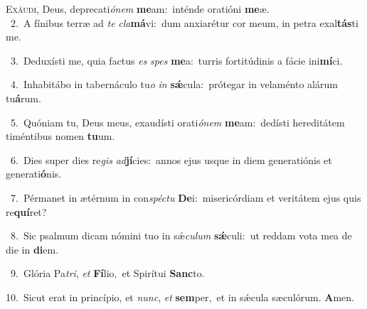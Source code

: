 \lettrine{\initial\textcolor{\initialcolor}{E}}{xáudi,} Deus, deprecati\-\textit{ó}\-\textit{nem} \textbf{me}\-am:~\star inténde oratióni \textbf{me}\-æ.\\
{\numbfont\textcolor{\numbcolor}{~2.}}~A fínibus terræ ad \textit{te} \textit{cla}\-\textbf{má}vi:~\star dum anxiarétur cor meum, in petra exal\-\textbf{tás}\-ti me.\par
{\numbfont\textcolor{\numbcolor}{~3.}}~Deduxísti me, quia factus \textit{es} \textit{spes} \textbf{me}\-a:~\star turris fortitúdinis a fácie ini\-\textbf{mí}\-ci.\par
{\numbfont\textcolor{\numbcolor}{~4.}}~Inhabitábo in tabernáculo tu\textit{o} \textit{in} \textbf{sǽ}\-cula:~\star prótegar in velaménto alárum tu\-\textbf{á}\-rum.\par
{\numbfont\textcolor{\numbcolor}{~5.}}~Quóniam tu, Deus meus, exaudísti orati\-\textit{ó}\-\textit{nem} \textbf{me}\-am:~\star dedísti hereditátem timéntibus nomen \textbf{tu}\-um.\par
{\numbfont\textcolor{\numbcolor}{~6.}}~Dies super dies re\textit{gis} \textit{ad}\-\textbf{jí}cies:~\star annos ejus usque in diem generatiónis et generati\-\textbf{ó}\-nis.\par
{\numbfont\textcolor{\numbcolor}{~7.}}~Pérmanet in ætérnum in con\-\textit{spéc}\-\textit{tu} \textbf{De}\-i:~\star misericórdiam et veritátem ejus quis re\-\textbf{quí}\-ret?\par
{\numbfont\textcolor{\numbcolor}{~8.}}~Sic psalmum dicam nómini tuo in sǽ\-\textit{cu}\-\textit{lum} \textbf{sǽ}\-culi:~\star ut reddam vota mea de die in \textbf{di}\-em.\par
{\numbfont\textcolor{\numbcolor}{~9.}}~Glória Pa\-\textit{tri}\-, \textit{et} \textbf{Fí}\-lio,~\star et Spirítui \textbf{Sanc}\-to.\par
{\numbfont\textcolor{\numbcolor}{10.}}~Sicut erat in princípio, et \textit{nunc}\-, \textit{et} \textbf{sem}\-per,~\star et in sǽcula sæculórum. \textbf{A}\-men.\par
